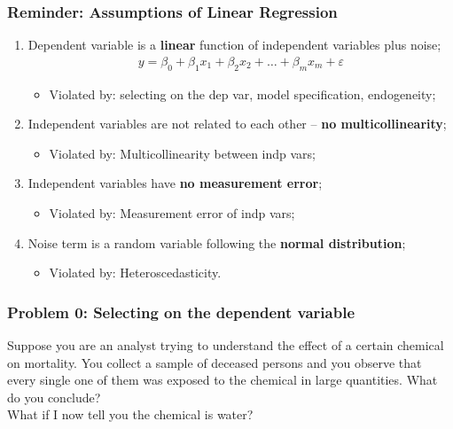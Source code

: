 \documentclass[aspectratio=169]{beamer}
\theoremstyle{principle}
\begin{document}
\begin{frame}
\frametitle{Reminder: Assumptions of Linear Regression}

\begin{enumerate}
\item Dependent variable is a \textbf{linear} function of independent variables plus noise;
\begin{align*}
y = \beta_0 + \beta_1x_1 + \beta_2x_2 + \hdots + \beta_mx_m + \varepsilon
\end{align*}
\begin{itemize}
\item Violated by: selecting on the dep var, model specification, endogeneity;
\end{itemize}
\bigskip

\item Independent variables are not related to each other -- \textbf{no multicollinearity};
\begin{itemize}
\item Violated by: Multicollinearity between indp vars;
\end{itemize}
\bigskip

\item Independent variables have \textbf{no measurement error};
\begin{itemize}
\item Violated by: Measurement error of indp vars;
\end{itemize}
\bigskip

\item Noise term is a random variable following the \textbf{normal distribution};
\begin{itemize}
\item Violated by: Heteroscedasticity.
\end{itemize}

\end{enumerate}

\end{frame}

\begin{frame}
\frametitle{Problem 0: Selecting on the dependent variable}

Suppose you are an analyst trying to understand the effect of a certain chemical on mortality.  You collect a sample of deceased persons and you observe that every single one of them was exposed to the chemical in large quantities.  What do you conclude?\\
\bigskip
\color{white}What if I now tell you the chemical is water?

\end{frame}
\end{document}
